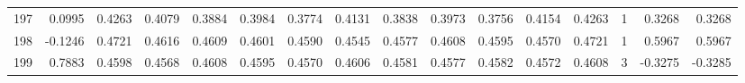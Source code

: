 \begin{tabular}{lrrrrrrrrrrrrrrr}
197 &      0.0995 &  0.4263 &  0.4079 &  0.3884 &  0.3984 &  0.3774 &  0.4131 &  0.3838 &  0.3973 &  0.3756 &   0.4154 &     0.4263 &      1 &                    0.3268 &                     0.3268 \\
198 &     -0.1246 &  0.4721 &  0.4616 &  0.4609 &  0.4601 &  0.4590 &  0.4545 &  0.4577 &  0.4608 &  0.4595 &   0.4570 &     0.4721 &      1 &                    0.5967 &                     0.5967 \\
199 &      0.7883 &  0.4598 &  0.4568 &  0.4608 &  0.4595 &  0.4570 &  0.4606 &  0.4581 &  0.4577 &  0.4582 &   0.4572 &     0.4608 &      3 &                   -0.3275 &                    -0.3285 \\
\bottomrule
\end{tabular}
